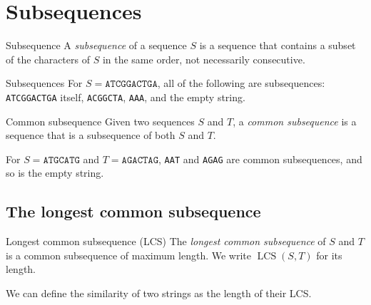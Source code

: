 \documentclass[a4paper,12pt,oneside]{report}
\newcommand{\LCS}{\operatorname{LCS}}
\begin{document}
\section{Subsequences}

\begin{frameddefn}{Subsequence}\label{def:subsequence}
A \emph{subsequence} of a sequence $S$ is a sequence that contains a
subset of the characters of $S$ in the same order, not necessarily
consecutive.
\end{frameddefn}

\begin{framedexample}{Subsequences}\label{ex:subsequences}
For $S=\texttt{ATCGGACTGA}$, all of the following are subsequences:
\texttt{ATCGGACTGA} itself, \texttt{ACGGCTA}, \texttt{AAA}, and the
empty string.
\end{framedexample}

\begin{frameddefn}{Common subsequence}\label{def:common-subsequence}
Given two sequences $S$ and $T$, a \emph{common subsequence} is a
sequence that is a subsequence of both $S$ and $T$.
\end{frameddefn}

For $S=\texttt{ATGCATG}$ and $T=\texttt{AGACTAG}$, \texttt{AAT} and
\texttt{AGAG} are common subsequences, and so is the empty string.

\subsection{The longest common subsequence}

\begin{frameddefn}{Longest common subsequence (LCS)}\label{def:lcs}
The \emph{longest common subsequence} of $S$ and $T$ is a common
subsequence of maximum length. We write $\LCS(S,T)$ for its length.
\end{frameddefn}

We can define the similarity of two strings as the length of their
LCS.
\end{document}
